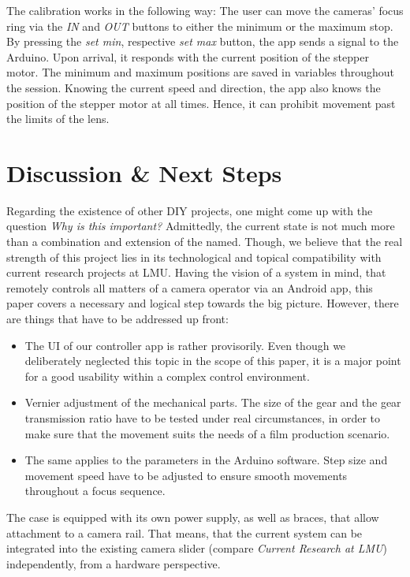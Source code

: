 \documentclass{sigchi}
\begin{document}
The calibration works in the following way: The user can move the cameras' focus ring via the \textit{IN} and \textit{OUT} buttons to either the minimum or the maximum stop. By pressing the \textit{set min}, respective \textit{set max} button, the app sends a signal to the Arduino. Upon arrival, it responds with the current position of the stepper motor. The minimum and maximum positions are saved in variables throughout the session. Knowing the current speed and direction, the app also knows the position of the stepper motor at all times. Hence, it can prohibit movement past the limits of the lens.


\section{Discussion \& Next Steps}

Regarding the existence of other DIY projects, one might come up with the question \textit{Why is this important?} Admittedly, the current state is not much more than a combination and extension of the named. Though, we believe that the real strength of this project lies in its technological and topical compatibility with current research projects at LMU. Having the vision of a system in mind, that remotely controls all matters of a camera operator via an Android app, this paper covers a necessary and logical step towards the big picture. 
However, there are things that have to be addressed up front: 
\begin{itemize}
  \item The UI of our controller app is rather provisorily. Even though we deliberately neglected this topic in the scope of this paper, it is a major point for a good usability within a complex control environment.
  \item Vernier adjustment of the mechanical parts. The size of the gear and the gear transmission ratio have to be tested under real circumstances, in order to make sure that the movement suits the needs of a film production scenario.
  \item The same applies to the parameters in the Arduino software. Step size and movement speed have to be adjusted to ensure smooth movements throughout a focus sequence.
\end{itemize}

The case is equipped with its own power supply, as well as braces, that allow attachment to a camera rail. That means, that the current system can be integrated into the existing camera slider (compare \textit{Current Research at LMU}) independently, from a hardware perspective. 
\end{document}
